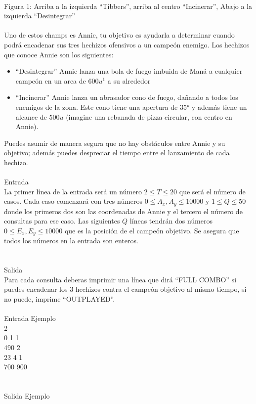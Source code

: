 \documentclass[12pt]{article}
\begin{document}
\\Figura 1: Arriba a la izquierda “Tibbers”, arriba al centro “Incinerar”, Abajo a la izquierda “Desintegrar”\\
\\
Uno de estos champs es Annie, tu objetivo es ayudarla a determinar cuando podrá encadenar sus tres hechizos  ofensivos a un campeón enemigo. Los hechizos que conoce Annie son los siguientes:
\begin{itemize}
\item “Desintegrar” Annie lanza una bola de fuego imbuida de Maná a cualquier campeón en un area de $600u^1$ a su alrededor
\item “Incinerar” Annie lanza un abrasador cono de fuego, dañando a todos los enemigos de la zona. Este cono tiene  una apertura de 35° y además tiene un alcance de $500u$ (imagine una rebanada de pizza circular, con centro en Annie).
\end{itemize}
Puedes asumir de manera segura que no hay obstáculos entre Annie y su objetivo; además puedes despreciar el tiempo entre el lanzamiento de cada hechizo.
\\
\\
\textrm{\large Entrada}
\\
La primer línea de la entrada será un número $2 ≤ T ≤ 20$ que será el número de casos. Cada caso comenzará con tres números $0 ≤ A_x, A_y ≤ 10000$ y $1 ≤ Q ≤ 50$ donde los primeros dos son las coordenadas de Annie y el tercero el número de consultas para ese caso. Las siguientes $Q$ líneas tendrán dos números $0 ≤ E_x, E_y ≤ 10000$ que es la posición de el campeón objetivo. Se asegura que todos los números en la entrada son enteros.\\
\\
\\
\textrm{\large Salida}
\\
Para cada consulta deberas imprimir una línea que dirá “FULL COMBO” si puedes encadenar los 3 hechizos contra el campeón objetivo al mismo tiempo, si no puede, imprime “OUTPLAYED”.
\\
\\
\textrm{\large Entrada Ejemplo}
\\
2\\
0 1 1\\
490 2\\
23 4 1\\
700 900\\
\\
\\
\textrm{\large Salida Ejemplo}
\end{document}
